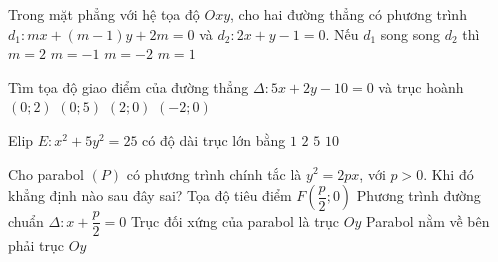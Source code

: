 \begin{ex}%
	Trong mặt phẳng với hệ tọa độ $Oxy$, cho hai đường thẳng có phương trình $d_{1} \colon mx+(m-1)y+2m=0$ và $d_{2} \colon 2x+y-1=0$. Nếu $d_{1}$ song song $d_{2}$ thì 
	\choice
	{\True $m=2$}
	{$m=-1$}
	{$m=-2$}
	{$m=1$}
\end{ex}

\begin{ex}%
	Tìm tọa độ giao điểm của đường thẳng $\Delta \colon 5x+2y-10=0$ và trục hoành
	\choice
	{$(0;2)$}
	{$(0;5)$}
	{\True $(2;0)$}
	{$(-2;0)$}
	\end{ex}

\begin{ex}%
	Elip $E \colon x^{2}+5y^{2}=25$ có độ dài trục lớn bằng 
	\choice
	{$1$}
	{$2$}
	{$5$}
	{\True $10$}
\end{ex}


\begin{ex}%
Cho parabol $(P)$ có phương trình chính tắc là $y^{2}=2px$, với $p>0$. Khi đó khẳng định nào sau đây sai?
	\choice
	{Tọa độ tiêu điểm $F\left(\dfrac{p}{2};0\right)$}
	{Phương trình đường chuẩn $\Delta \colon x+\dfrac{p}{2}=0$}
	{\True Trục đối xứng của parabol là trục $Oy$}
	{Parabol nằm về bên phải trục $Oy$}
\end{ex}


